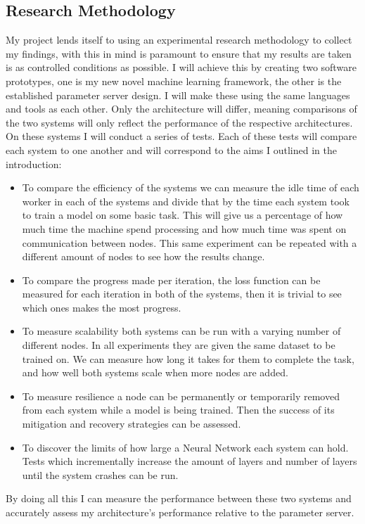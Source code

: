 \subsection{Research Methodology}
My project lends itself to using an experimental research methodology to collect
my findings, with this in mind is paramount to ensure that my results are taken
is as controlled conditions as possible. I will achieve this by
creating two software prototypes, one is my new novel machine learning
framework, the other is the established parameter server design. I will make
these using the same languages and tools as each other. Only the architecture
will differ, meaning comparisons of the two systems will only reflect the
performance of the respective architectures. On these systems I will conduct a
series of tests. Each of these tests will compare each system to one another and
will correspond to the aims I outlined in the introduction:
\begin{itemize}
    \item To compare the efficiency of the systems we can measure the idle time
    of each worker in each of the systems and divide that by the time each
    system took to train a model on some basic task. This will give us a
    percentage of how much time the machine spend processing and how much time
    was spent on communication between nodes. This same experiment can be
    repeated with a different amount of nodes to see how the results change.
    \item To compare the progress made per iteration, the loss function can be
    measured for each iteration in both of the systems, then it is trivial to
    see which ones makes the most progress.
    \item To measure scalability both systems can be run with a varying number
    of different nodes. In all experiments they are given the same dataset to be
    trained on. We can measure how long it takes for them to complete the task,
    and how well both systems scale when more nodes are added.
    \item To measure resilience a node can be permanently or temporarily removed
    from each system while a model is being trained. Then the success of its
    mitigation and recovery strategies can be assessed.
    \item To discover the limits of how large a Neural Network each system can
    hold. Tests which incrementally increase the amount of layers and number of
    layers until the system crashes can be run.
\end{itemize}
By doing all this I can measure the performance between these two systems and
accurately assess my architecture's performance relative to the parameter server.

